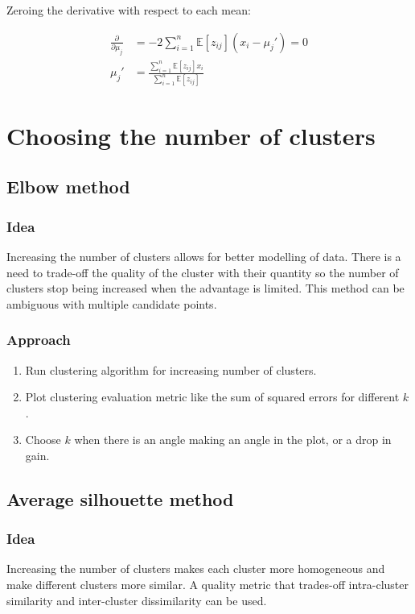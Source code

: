 		Zeroing the derivative with respect to each mean:

		\begin{align*}
			\frac{\partial}{\partial\mu_j} &= -2\sum\limits_{i=1}^n\mathbb{E}[z_{ij}](x_i-\mu_j') = 0\\
			\mu_j' &=\frac{\sum\limits_{i=1}^n\mathbb{E}[z_{ij}]x_i}{\sum\limits_{i=1}^n\mathbb{E}[z_{ij}]}
		\end{align*}





\section{Choosing the number of clusters}

	\subsection{Elbow method}

		\subsubsection{Idea}
	Increasing the number of clusters allows for better modelling of data.
	There is a need to trade-off the quality of the cluster with their quantity so the number of clusters stop being increased when the advantage is limited.
	This method can be ambiguous with multiple candidate points.

		\subsubsection{Approach}

		\begin{enumerate}
			\item Run clustering algorithm for increasing number of clusters.
			\item Plot clustering evaluation metric like the sum of squared errors for different $k$.
			\item Choose $k$ when there is an angle making an angle in the plot, or a drop in gain.
		\end{enumerate}


	\subsection{Average silhouette method}

		\subsubsection{Idea}
		Increasing the number of clusters makes each cluster more homogeneous and make different clusters more similar.
		A quality metric that trades-off intra-cluster similarity and inter-cluster dissimilarity can be used.

